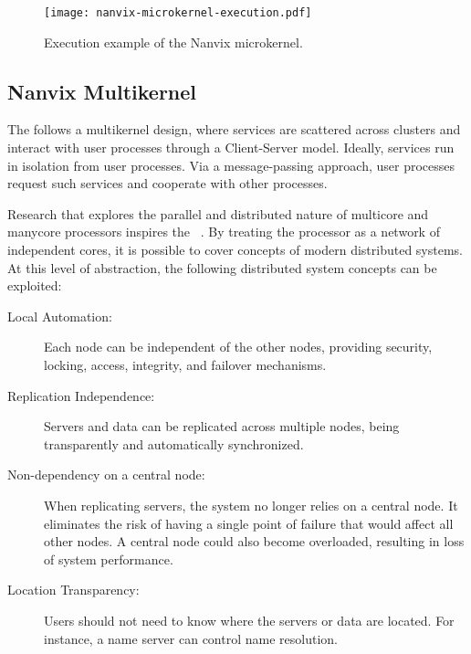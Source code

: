 		\begin{figure}[!tb]
			\centering%
			\caption{Execution example of the Nanvix microkernel.}%
			\label{fig:microkernel-execution}%
			\texttt{[image: nanvix-microkernel-execution.pdf]}%
		\end{figure}

	\subsection{Nanvix Multikernel}
	\label{sec.multikernel}

		The \nanvix \multikernel follows a multikernel design, where \os services
		are scattered across clusters and interact with user processes through a
		Client-Server model.
		Ideally, \os services run in isolation from user processes.
		Via a message-passing approach, user processes request such services and
		cooperate with other processes.

		Research that explores the parallel and distributed nature of multicore and
		manycore processors inspires the \nanvix \multikernel~\cite{wentzlaff_factored_2009, baumann_multikernel:_2009, Wisniewski2014}.
		By treating the processor as a network of independent cores, it is possible
		to cover concepts of modern distributed systems.
		At this level of abstraction, the following distributed system concepts can be exploited:

		\begin{description}

			\item[Local Automation:] Each node can be independent of the other nodes, providing
				security, locking, access, integrity, and failover mechanisms.

			\item[Replication Independence:] Servers and data can be replicated across multiple
				nodes, being transparently and automatically synchronized.

			\item[Non-dependency on a central node:] When replicating servers, the system no
				longer relies on a central node.
				It eliminates the risk of having a single point of failure that would affect all other nodes.
				A central node could also become overloaded, resulting in loss of system performance.

			\item[Location Transparency:] Users should not need to know where the servers
				or data are located. For instance, a name server can control name resolution.

		\end{description}

